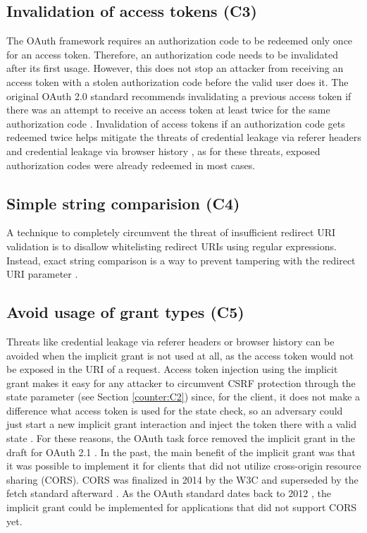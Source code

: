 \subsection[Invalidation of access tokens]{Invalidation of access tokens (C3)}
\label{counter:C3}
The OAuth framework requires an authorization code to be redeemed only once for an access token. Therefore, an authorization code needs to be invalidated after its first usage. However, this does not stop an attacker from receiving an access token with a stolen authorization code before the valid user does it. The original OAuth 2.0 standard recommends invalidating a previous access token if there was an attempt to receive an access token at least twice for the same authorization code \cite{hardt2012rfc}. Invalidation of access tokens if an authorization code gets redeemed twice helps mitigate the threats of credential leakage via referer headers and credential leakage via browser history \cite{lodderstedt2020oauth}, as for these threats, exposed authorization codes were already redeemed in most cases.

\subsection[Simple string comparision]{Simple string comparision (C4)}
\label{counter:C4}
A technique to completely circumvent the threat of insufficient redirect URI validation is to disallow whitelisting redirect URIs using regular expressions. Instead, exact string comparison is a way to prevent tampering with the redirect URI parameter \cite{lodderstedt2020oauth}.

\subsection[Avoid usage of grant types]{Avoid usage of grant types (C5)}
\label{counter:C5}
Threats like credential leakage via referer headers or browser history can be avoided when the implicit grant is not used at all, as the access token would not be exposed in the URI of a request. Access token injection using the implicit grant makes it easy for any attacker to circumvent CSRF protection through the state parameter (see Section \ref{counter:C2}) since, for the client, it does not make a difference what access token is used for the state check, so an adversary could just start a new implicit grant interaction and inject the token there with a valid state \cite{lodderstedt2020oauth}. For these reasons, the OAuth task force removed the implicit grant in the draft for OAuth 2.1 \cite{hardt2023rfc}. In the past, the main benefit of the implicit grant was that it was possible to implement it for clients that did not utilize cross-origin resource sharing (CORS). CORS was finalized in 2014 by the W3C and superseded by the fetch standard afterward \cite{vanKesteren2014}. As the OAuth standard dates back to 2012 \cite{hardt2012rfc}, the implicit grant could be implemented for applications that did not support CORS yet.

